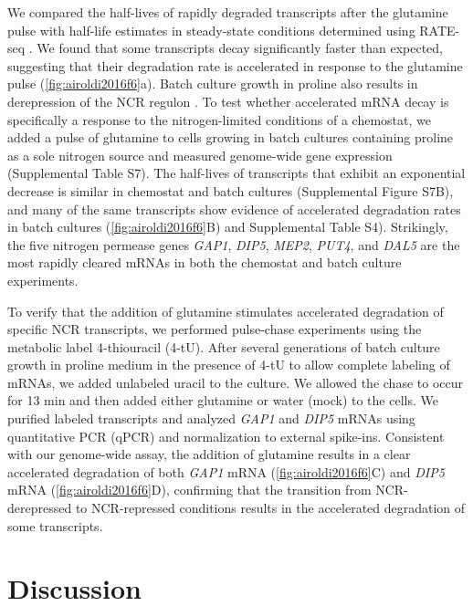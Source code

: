 We compared the half-lives of rapidly degraded transcripts
after the glutamine pulse with half-life estimates in steady-state
conditions determined using RATE-seq 
\parencite{neymotin2014determination}. We found
that some transcripts decay significantly faster than expected,
suggesting that their degradation rate is accelerated in response to
the glutamine pulse (\autoref{fig:airoldi2016f6}a). 
Batch culture growth in proline also
results in derepression of the NCR regulon 
\parencite{godard2007effect}. To
test whether accelerated mRNA decay is specifically a response to the
nitrogen-limited conditions of a chemostat, we added a pulse of
glutamine to cells growing in batch cultures containing proline as a
sole nitrogen source and measured genome-wide gene expression
(Supplemental Table S7). The half-lives of transcripts that exhibit an
exponential decrease is similar in chemostat and batch cultures
(Supplemental Figure S7B), and many of the same transcripts show
evidence of accelerated degradation rates in batch cultures 
(\autoref{fig:airoldi2016f6}B)
and Supplemental Table S4). Strikingly, the five nitrogen permease
genes \textit{GAP1}, \textit{DIP5}, \textit{MEP2}, 
\textit{PUT4}, and \textit{DAL5} are the most rapidly cleared
mRNAs in both the chemostat and batch culture experiments.  

To verify
that the addition of glutamine stimulates accelerated degradation of
specific NCR transcripts, we performed pulse-chase experiments using
the metabolic label 4-thiouracil (4-tU). After several generations of
batch culture growth in proline medium in the presence of 4-tU to
allow complete labeling of mRNAs, we added unlabeled uracil to the
culture. We allowed the chase to occur for 13 min and then added
either glutamine or water (mock) to the cells. We purified labeled
transcripts and analyzed \textit{GAP1} and \textit{DIP5} 
mRNAs using quantitative PCR
(qPCR) and normalization to external spike-ins. Consistent with our
genome-wide assay, the addition of glutamine results in a clear
accelerated degradation of both \textit{GAP1} mRNA 
(\autoref{fig:airoldi2016f6}C)
and \textit{DIP5} mRNA (\autoref{fig:airoldi2016f6}D), 
confirming that the transition from NCR-derepressed to
NCR-repressed conditions results in the accelerated degradation of
some transcripts.  

\section{Discussion} 

